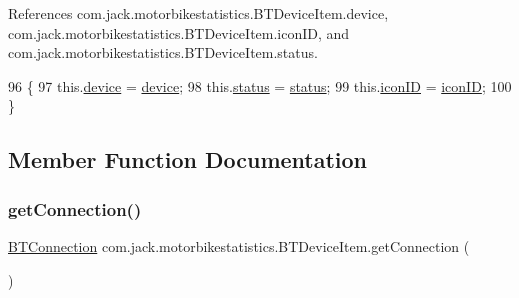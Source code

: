 References com.\+jack.\+motorbikestatistics.\+B\+T\+Device\+Item.\+device, com.\+jack.\+motorbikestatistics.\+B\+T\+Device\+Item.\+icon\+ID, and com.\+jack.\+motorbikestatistics.\+B\+T\+Device\+Item.\+status.


\begin{DoxyCode}
96     \{
97         this.\hyperlink{classcom_1_1jack_1_1motorbikestatistics_1_1_b_t_device_item_acd943b008d77dcb5d72f8a65fa4986b9}{device} = \hyperlink{classcom_1_1jack_1_1motorbikestatistics_1_1_b_t_device_item_acd943b008d77dcb5d72f8a65fa4986b9}{device};
98         this.\hyperlink{classcom_1_1jack_1_1motorbikestatistics_1_1_b_t_device_item_ae7a8756973644c5719d5faddf3fa7946}{status} = \hyperlink{classcom_1_1jack_1_1motorbikestatistics_1_1_b_t_device_item_ae7a8756973644c5719d5faddf3fa7946}{status};
99         this.\hyperlink{classcom_1_1jack_1_1motorbikestatistics_1_1_b_t_device_item_a77f7a3c228f87fa5e946fe77b310f805}{iconID} = \hyperlink{classcom_1_1jack_1_1motorbikestatistics_1_1_b_t_device_item_a77f7a3c228f87fa5e946fe77b310f805}{iconID};
100     \}
\end{DoxyCode}


\subsection{Member Function Documentation}
\mbox{\label{classcom_1_1jack_1_1motorbikestatistics_1_1_b_t_device_item_ac3fbff10e5a5b3142ef648bf186b9be0}} 
\subsubsection{\texorpdfstring{get\+Connection()}{getConnection()}}
{\footnotesize\ttfamily \hyperlink{classcom_1_1jack_1_1motorbikestatistics_1_1_b_t_connection}{B\+T\+Connection} com.\+jack.\+motorbikestatistics.\+B\+T\+Device\+Item.\+get\+Connection (\begin{DoxyParamCaption}{ }\end{DoxyParamCaption})\hspace{0.3cm}{\ttfamily [inline]}}



